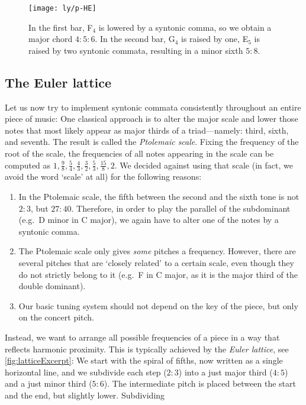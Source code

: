 \documentclass[british,11pt]{scrartcl}
\begin{document}
\begin{figure}\centering
  \texttt{[image: ly/p-HE]}
  \caption{In the first bar, \sharp F$_4$ is lowered by a syntonic comma, so
    we obtain a major chord $4:5:6$. In the second bar, G$_4$ is raised by
    one, \flat E$_5$ is raised by two syntonic commata, resulting in a minor sixth
    $5:8$.}\label{fig:HE}
\end{figure}

\subsection{The Euler lattice}

Let us now try to implement syntonic commata consistently throughout an entire
piece of music: One classical approach is to alter the major scale and lower
those notes that most likely appear as major thirds of a triad—namely: third,
sixth, and seventh. The result is called the \emph{Ptolemaic scale}.  Fixing the
frequency of the root of the scale, the frequencies of all notes appearing in
the scale can be computed as
$1,\frac98,\frac54,\frac43,\frac32,\frac53,\frac{15}8,2$. We decided against
using that scale (in fact, we avoid the word ‘scale’ at all) for the following
reasons:
\begin{enumerate}
\item In the Ptolemaic scale, the fifth between the second and the sixth tone is
  not $2:3$, but $27:40$. Therefore, in order to play the parallel of the
  subdominant (e.g.\ D minor in C major), we again have to alter one of the
  notes by a syntonic comma.
\item The Ptolemaic scale only gives \emph{some} pitches a frequency. However,
  there are several pitches that are ‘closely related’ to a certain scale, even
  though they do not strictly belong to it (e.g.\ \sharp F in C major, as it
  is the major third of the double dominant).
\item Our basic tuning system should not depend on the key of the piece,
  but only on the concert pitch.
\end{enumerate}
Instead, we want to arrange all possible frequencies of a piece in a way that
reflects harmonic proximity. This is typically achieved by the \emph{Euler
  lattice}, see \cref{fig:latticeExcerpt}: We start with the spiral of fifths,
now written as a single horizontal line, and we subdivide each step ($2:3$) into
a just major third ($4:5$) and a just minor third ($5:6$). The intermediate
pitch is placed between the start and the end, but slightly lower. Subdividing
\end{document}
